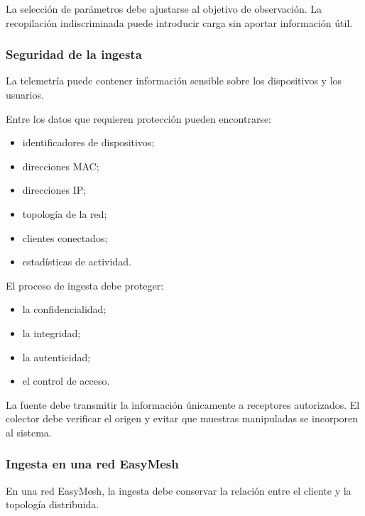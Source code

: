 La selección de parámetros debe ajustarse al objetivo de observación. La
recopilación indiscriminada puede introducir carga sin aportar
información útil.


\subsubsection*{Seguridad de la ingesta}

La telemetría puede contener información sensible sobre los dispositivos
y los usuarios.

Entre los datos que requieren protección pueden encontrarse:

\begin{itemize}
    \item identificadores de dispositivos;

    \item direcciones MAC;

    \item direcciones IP;

    \item topología de la red;

    \item clientes conectados;

    \item estadísticas de actividad.
\end{itemize}

El proceso de ingesta debe proteger:

\begin{itemize}
    \item la confidencialidad;

    \item la integridad;

    \item la autenticidad;

    \item el control de acceso.
\end{itemize}

La fuente debe transmitir la información únicamente a receptores
autorizados. El colector debe verificar el origen y evitar que muestras
manipuladas se incorporen al sistema.


\subsubsection*{Ingesta en una red EasyMesh}

En una red EasyMesh, la ingesta debe conservar la relación entre el
cliente y la topología distribuida.


